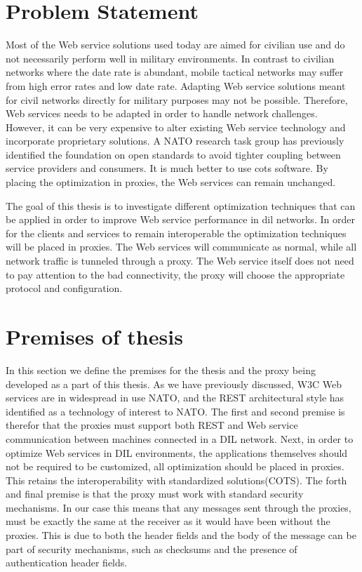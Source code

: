 \section{Problem Statement}
Most of the Web service solutions used today are aimed for civilian use and do
not necessarily perform well in military environments. In contrast to civilian
networks where the date rate is abundant, mobile tactical networks may suffer
from high error rates and low date rate. Adapting Web service solutions meant
for civil networks directly for military purposes may not be possible.
Therefore, Web services needs to be adapted in order to handle network
challenges. However, it can be very expensive to alter existing Web service
technology and incorporate proprietary solutions. A NATO research task group has
previously identified the foundation on open standards to avoid tighter coupling
between service providers and consumers\cite{ist-090}. It is much better to use
\gls{cots} software. By placing the optimization in proxies, the
Web services can remain unchanged.

The goal of this thesis is to investigate different optimization techniques that
can be applied in order to improve Web service performance in \gls{dil}
networks. In order for the clients and services to remain interoperable the
optimization techniques will be placed in proxies. The Web services will
communicate as normal, while all network traffic is tunneled through a proxy.
The Web service itself does not need to pay attention to the bad connectivity,
the proxy will choose the appropriate protocol and configuration.

\section{Premises of thesis}

In this section we define the premises for the thesis and the proxy being
developed as a part of this thesis. As we have previously discussed, W3C Web
services are in widespread in use NATO, and the REST architectural style
has identified as a technology of interest to NATO. The first and second
premise is therefor that the proxies must support both REST and Web service
communication between machines connected in a DIL network. Next, in order to
optimize Web services in DIL environments, the applications themselves should
not be required to be customized, all optimization should be placed in proxies.
This retains the interoperability with standardized solutions(COTS). The forth
and final premise is that the proxy must work with standard security mechanisms.
In our case this means that any messages sent through the proxies, must be
exactly the same at the receiver as it would have been without the proxies. This
is due to both the header fields and the body of the message can be part of
security mechanisms, such as checksums and the presence of authentication header
fields.

